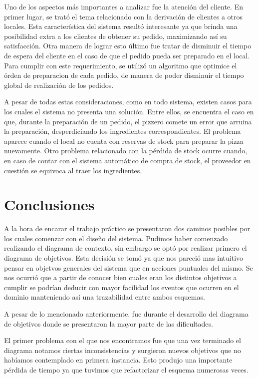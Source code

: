 \documentclass[a4paper,11pt] {article}
\begin{document}
Uno de los aspectos m\'as importantes a analizar fue la atenci\'on del cliente. En primer lugar, se trat\'o el tema relacionado con la derivaci\'on de clientes a otros locales. Esta caracter\'istica del sistema result\'o interesante ya que brinda una posibilidad extra a los clientes de obtener su pedido, maximizando as\'i su satisfacci\'on. Otra manera de lograr esto \'ultimo fue tratar de disminuir el tiempo de espera del cliente en el caso de que el pedido pueda ser preparado en el local. Para cumplir con este requerimiento, se utiliz\'o un algoritmo que optimice el \'orden de preparacion de cada pedido, de manera de poder disminuir el tiempo global de realizaci\'on de los pedidos.

A pesar de todas estas consideraciones, como en todo sistema, existen casos para los cuales el sistema no presenta una soluci\'on. Entre ellos, se encuentra el caso en que, durante la preparaci\'on de un pedido, el pizzero comete un error que arruina la preparaci\'on, desperdiciando los ingredientes correspondientes. El problema aparece cuando el local no cuenta con reservas de stock para preparar la pizza nuevamente. Otro problema relacionado con la p\'erdida de stock ocurre cuando, en caso de contar con el sistema autom\'atico de compra de stock, el proveedor en cuesti\'on se equivoca al traer los ingredientes.

\section*{Conclusiones}

A la hora de encarar el trabajo pr\'actico se presentaron dos caminos posibles por los cuales comenzar con el dise\~no del sistema. Pudimos haber comenzado realizando el diagrama de contexto, sin embargo se opt\'o por realizar primero el diagrama de objetivos. Esta decisi\'on se tom\'o ya que nos pareci\'o mas intuitivo pensar en objetvos generales del sistema que en acciones puntuales del mismo. Se nos ocurri\'o que a partir de conocer bien cuales eran los distintos objetivos a cumplir se podr\'ian deducir con mayor facilidad los eventos que ocurren en el dominio manteniendo as\'i una trazabilidad entre ambos esquemas.

A pesar de lo mencionado anteriormente, fue durante el desarrollo del diagrama de objetivos donde se presentaron la mayor parte de las dificultades. 

El primer problema con el que nos encontramos fue que una vez terminado el diagrama notamos ciertas inconsistencias y surgieron nuevos objetivos que no hab\'iamos contemplado en primera instancia. Esto produjo una importante p\'erdida de tiempo ya que tuvimos que refactorizar el esquema numerosas veces.
\end{document}
